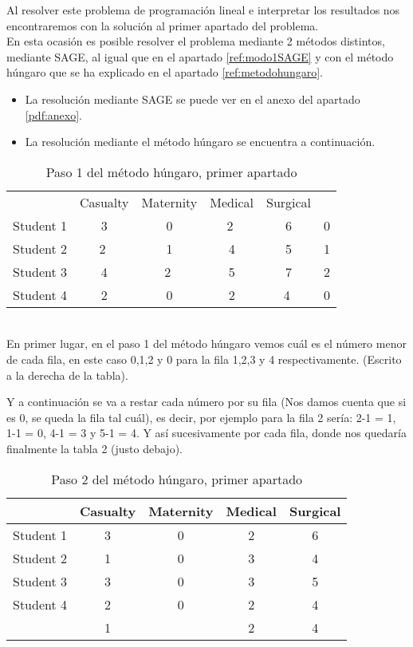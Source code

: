 \documentclass[11pt]{article}
\begin{document}
Al resolver este problema de programación lineal e interpretar los resultados nos encontraremos con la solución al primer apartado del problema.\\

En esta ocasión es posible resolver el problema mediante 2 métodos distintos, mediante SAGE, al igual que en el apartado \ref{ref:modo1SAGE} y con el método húngaro que se ha explicado en el apartado \ref{ref:metodohungaro}.

\begin{itemize}
    \item La resolución mediante SAGE se puede ver en el anexo del apartado \ref{pdf:anexo}.
    \item La resolución mediante el método húngaro se encuentra a continuación.\\
\end{itemize}


\begin{table}[H]
\centering
\begin{tabular}{lccccl}
\cline{1-5}
 & \multicolumn{1}{l}{Casualty} & \multicolumn{1}{l}{Maternity} & \multicolumn{1}{l}{Medical} & \multicolumn{1}{l}{Surgical} &  \\ \cline{1-5}
Student 1 & 3 & 0 & \textcircled{2} & 6 & 0 \\
Student 2 & \textcircled{2} & 1 & 4 & 5 & 1 \\
Student 3 & 4 & \textcircled{2} & 5 & 7 & 2 \\
Student 4 & 2 & 0 & 2 & \textcircled{4} & 0 \\ \cline{1-5}
\end{tabular}
\caption{Paso 1 del método húngaro, primer apartado}
\end{table}

\\En primer lugar, en el paso 1 del método húngaro vemos cuál es el número menor de cada fila, en este caso 0,1,2 y 0 para la fila 1,2,3 y 4 respectivamente. (Escrito a la derecha de la tabla).

Y a continuación se va a restar cada número por su fila (Nos damos cuenta que si es 0, se queda la fila tal cuál), es decir, por ejemplo para la fila 2 sería: 2-1 = 1, 1-1 = 0, 4-1 = 3 y 5-1 = 4. Y así sucesivamente por cada fila, donde nos quedaría finalmente la tabla 2 (justo debajo).\\

\begin{table}[H]
\centering
\begin{tabular}{lcccc}
\hline
 & \multicolumn{1}{l}{Casualty} & \multicolumn{1}{l}{Maternity} & \multicolumn{1}{l}{Medical} & \multicolumn{1}{l}{Surgical} \\ \hline
Student 1 & 3 & 0 & 2 & 6 \\
Student 2 & 1 & 0 & 3 & 4 \\
Student 3 & 3 & 0 & 3 & 5 \\
Student 4 & 2 & 0 & 2 & 4 \\ \hline
 & 1 &  & 2 & 4
\end{tabular}
\caption{Paso 2 del método húngaro, primer apartado}
\end{table}
\end{document}
